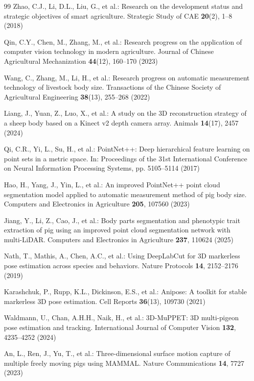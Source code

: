 \documentclass[runningheads]{llncs}
\begin{document}
\begin{thebibliography}{99}
Zhao, C.J., Li, D.L., Liu, G., et al.: Research on the development status and strategic objectives of smart agriculture. Strategic Study of CAE \textbf{20}(2), 1--8 (2018)

Qin, C.Y., Chen, M., Zhang, M., et al.: Research progress on the application of computer vision technology in modern agriculture. Journal of Chinese Agricultural Mechanization \textbf{44}(12), 160--170 (2023)

Wang, C., Zhang, M., Li, H., et al.: Research progress on automatic measurement technology of livestock body size. Transactions of the Chinese Society of Agricultural Engineering \textbf{38}(13), 255--268 (2022)

Liang, J., Yuan, Z., Luo, X., et al.: A study on the 3D reconstruction strategy of a sheep body based on a Kinect v2 depth camera array. Animals \textbf{14}(17), 2457 (2024)

Qi, C.R., Yi, L., Su, H., et al.: PointNet++: Deep hierarchical feature learning on point sets in a metric space. In: Proceedings of the 31st International Conference on Neural Information Processing Systems, pp. 5105--5114 (2017)

Hao, H., Yang, J., Yin, L., et al.: An improved PointNet++ point cloud segmentation model applied to automatic measurement method of pig body size. Computers and Electronics in Agriculture \textbf{205}, 107560 (2023)

Jiang, Y., Li, Z., Cao, J., et al.: Body parts segmentation and phenotypic trait extraction of pig using an improved point cloud segmentation network with multi-LiDAR. Computers and Electronics in Agriculture \textbf{237}, 110624 (2025)

Nath, T., Mathis, A., Chen, A.C., et al.: Using DeepLabCut for 3D markerless pose estimation across species and behaviors. Nature Protocols \textbf{14}, 2152--2176 (2019)

Karashchuk, P., Rupp, K.L., Dickinson, E.S., et al.: Anipose: A toolkit for stable markerless 3D pose estimation. Cell Reports \textbf{36}(13), 109730 (2021)

Waldmann, U., Chan, A.H.H., Naik, H., et al.: 3D-MuPPET: 3D multi-pigeon pose estimation and tracking. International Journal of Computer Vision \textbf{132}, 4235--4252 (2024)

An, L., Ren, J., Yu, T., et al.: Three-dimensional surface motion capture of multiple freely moving pigs using MAMMAL. Nature Communications \textbf{14}, 7727 (2023)


\end{thebibliography}
\end{document}
